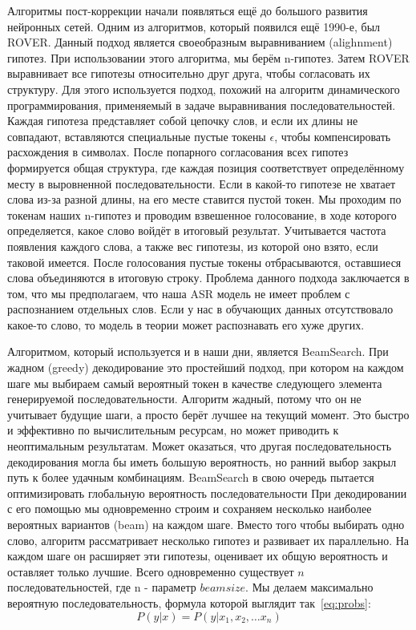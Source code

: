 Алгоритмы пост-коррекции начали появляться ещё до большого развития нейронных сетей.
Одним из алгоритмов, который появился ещё 1990-е, был ROVER\cite{fiscus1997post}.
Данный подход является своеобразным выравниванием (alighnment) гипотез.
При использовании этого алгоритма, мы берём n-гипотез. 
Затем ROVER выравнивает все гипотезы относительно друг друга, чтобы согласовать их структуру.
Для этого используется подход, похожий на алгоритм динамического программирования, применяемый в задаче выравнивания последовательностей.
Каждая гипотеза представляет собой цепочку слов, и если их длины не совпадают, вставляются специальные пустые токены $\epsilon$, чтобы компенсировать расхождения в символах.
После попарного согласования всех гипотез формируется общая структура, где каждая позиция соответствует определённому месту в выровненной последовательности.
Если в какой-то гипотезе не хватает слова из-за разной длины, на его месте ставится пустой токен.
Мы проходим по токенам наших n-гипотез и проводим взвешенное голосование, в ходе которого определяется, какое слово войдёт в итоговый результат.
Учитывается частота появления каждого слова, а также вес гипотезы, из которой оно взято, если таковой имеется.
После голосования пустые токены отбрасываются, оставшиеся слова объединяются в итоговую строку.
Проблема данного подхода заключается в том, что мы предполагаем, что наша ASR модель не имеет проблем с распознанием отдельных слов.
Если у нас в обучающих данных отсутствовало какое-то слово, то модель в теории может распознавать его хуже других.

Алгоритмом, который используется и в наши дни, является BeamSearch\cite{freitag2017beam}.
При жадном (greedy) декодирование это простейший подход, при котором на каждом шаге мы выбираем самый вероятный токен в качестве следующего элемента генерируемой последовательности.
Алгоритм жадный, потому что он не учитывает будущие шаги, а просто берёт лучшее на текущий момент.
Это быстро и эффективно по вычислительным ресурсам, но может приводить к неоптимальным результатам.
Может оказаться, что другая последовательность декодирования могла бы иметь большую вероятность, но ранний выбор закрыл путь к более удачным комбинациям.
BeamSearch в свою очередь пытается оптимизировать глобальную вероятность последовательности
При декодировании с его помощью мы одновременно строим и сохраняем несколько наиболее вероятных вариантов (beam) на каждом шаге.
Вместо того чтобы выбирать одно слово, алгоритм рассматривает несколько гипотез и развивает их параллельно.
На каждом шаге он расширяет эти гипотезы, оценивает их общую вероятность и оставляет только лучшие.
Всего одновременно существует $n$ последовательностей, где n - параметр $beam size$.
Мы делаем максимально вероятную последовательность, формула которой выглядит так~\ref{eq:probs}:
\begin{equation}
  P(y|x) = P(y|x_1,x_2,\dots x_n)
  \label{eq:probs}
\end{equation}

